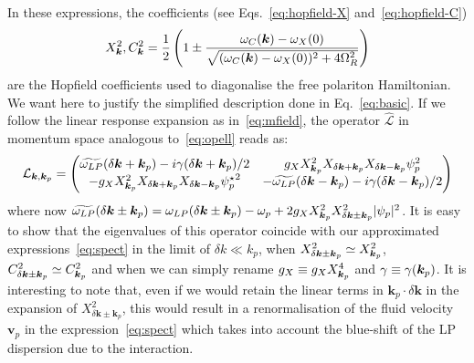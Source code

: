 \begin{subappendices}
In these expressions, the coefficients (see Eqs.~\eqref{eq:hopfield-X}
and~\eqref{eq:hopfield-C}) 
%
\begin{equation}
  X^2_{\bm{k}}, C^2_{\bm{k}} = \frac{1}{2} \left(1 \pm \frac{\omega_C(\bm{k}) -
    \omega_X(0)}{\sqrt{(\omega_C(\bm{k}) - \omega_X(0))^2 +
      4\Omega_R^2}}\right)
\end{equation}
%
are the Hopfield coefficients used to diagonalise the free polariton
Hamiltonian. We want here to justify the simplified description done
in Eq.~\eqref{eq:basic}. If we follow the linear response expansion as
in~\eqref{eq:mfield}, the operator $\hat{\mathcal{L}}$ in momentum
space analogous to~\eqref{eq:opell} reads as:
%
\begin{equation}
  \mathcal{L}_{\bm{k},\bm{k}_p} = \begin{pmatrix}
    \widetilde{\omega_{LP}} (\delta \bm{k}+\bm{k}_p) - i
    \gamma(\delta \bm{k}+\bm{k}_p)/2 & g_X X_{\bm{k}_p}^2 X_{\delta
      \bm{k}+\bm{k}_p} X_{\delta \bm{k}-\bm{k}_p} \psi_p^2
    \\ - g_X X_{\bm{k}_p}^2 X_{\delta \bm{k}+\bm{k}_p} X_{\delta
      \bm{k}-\bm{k}_p}{\psi_p^{\star}}^2 & -
    \widetilde{\omega_{LP}}(\delta \bm{k}-\bm{k}_p) -
    i\gamma(\delta \bm{k}-\bm{k}_p)/2 \end{pmatrix}
\label{eq:opel2}
\end{equation}
%
where now $\widetilde{\omega_{LP}} (\delta \bm{k} \pm\bm{k}_p) =
\omega_{LP} (\delta \bm{k} \pm\bm{k}_p) -\omega_p + 2 g_X X_{\bm{k}_p}^2
X_{\delta \bm{k} \pm \bm{k}_p}^2 |\psi_p|^2$. It is easy to show that
the eigenvalues of this operator coincide with our approximated
expressions~\eqref{eq:spect} in the limit of $\delta k \ll k_p$,
when $X_{\delta \bm{k} \pm \bm{k}_p}^2 \simeq X_{\bm{k}_p}^2$, $C_{\delta
\bm{k} \pm \bm{k}_p}^2 \simeq C_{\bm{k}_p}^2$ and when we can simply
rename $g_X \equiv g_X X_{\bm{k}_p}^4$ and $\gamma \equiv
\gamma(\bm{k}_p)$. It is interesting to note that, even if we would
retain the linear terms in $\bm{k}_p \cdot \delta \bm{k}$ in the
expansion of $X_{\delta \bm{k} \pm \bm{k}_p}^2$, this would result in
a renormalisation of the fluid velocity $\bm{v}_p$ in the
expression~\eqref{eq:spect} which takes into account the blue-shift of
the LP dispersion due to the interaction.
\end{subappendices}


